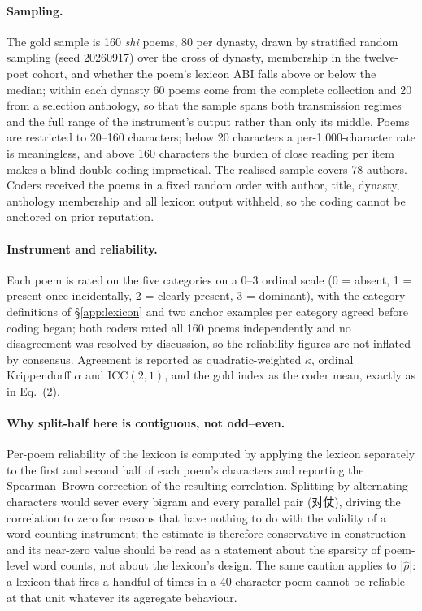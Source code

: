 \documentclass[11pt]{article}
\begin{document}
\paragraph{Sampling.}
The gold sample is 160 \emph{shi} poems, 80 per dynasty, drawn by stratified random
sampling (seed 20260917) over the cross of dynasty, membership in the twelve-poet
cohort, and whether the poem's lexicon ABI falls above or below the median; within
each dynasty 60 poems come from the complete collection and 20 from a selection
anthology, so that the sample spans both transmission regimes and the full range of
the instrument's output rather than only its middle. Poems are restricted to 20--160
characters; below 20 characters a per-1{,}000-character rate is meaningless, and
above 160 characters the burden of close reading per item makes a blind double
coding impractical. The realised sample covers 78 authors. Coders received the poems
in a fixed random order with author, title, dynasty, anthology membership and all
lexicon output withheld, so the coding cannot be anchored on prior reputation.

\paragraph{Instrument and reliability.}
Each poem is rated on the five categories on a 0--3 ordinal scale (0 = absent, 1 =
present once incidentally, 2 = clearly present, 3 = dominant), with the category
definitions of \S\ref{app:lexicon} and two anchor examples per category agreed before
coding began; both coders rated all 160 poems independently and no disagreement was
resolved by discussion, so the reliability figures are not inflated by consensus.
Agreement is reported as quadratic-weighted $\kappa$, ordinal Krippendorff $\alpha$
and ICC$(2,1)$, and the gold index as the coder mean, exactly as in Eq.~(2).

\paragraph{Why split-half here is contiguous, not odd--even.}
Per-poem reliability of the lexicon is computed by applying the lexicon separately to
the first and second half of each poem's characters and reporting the Spearman--Brown
correction of the resulting correlation. Splitting by alternating characters would
sever every bigram and every parallel pair (对仗), driving the correlation to zero for
reasons that have nothing to do with the validity of a word-counting instrument; the
estimate is therefore conservative in construction and its near-zero value should be
read as a statement about the sparsity of poem-level word counts, not about the
lexicon's design. The same caution applies to $|\widehat{\rho}|$: a lexicon that
fires a handful of times in a 40-character poem cannot be reliable at that unit
whatever its aggregate behaviour.
\end{document}
